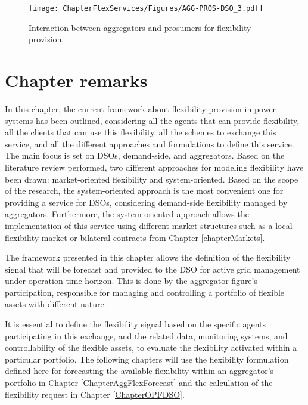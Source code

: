 \vspace*{8mm}

\begin{figure}[htbp]
	\centering
	\texttt{[image: ChapterFlexServices/Figures/AGG-PROS-DSO\_3.pdf]}
		\caption{Interaction between aggregators and prosumers for flexibility provision.}
	\label{fig:agg-pros-dso}  
\end{figure}

\newpage
\section{Chapter remarks}

In this chapter, the current framework about flexibility provision in power systems has been outlined, considering all the agents that can provide flexibility, all the clients that can use this flexibility, all the schemes to exchange this service, and all the different approaches and formulations to define this service. The main focus is set on DSOs, demand-side, and aggregators. 
Based on the literature review performed, two different approaches for modeling flexibility have been drawn: market-oriented flexibility and system-oriented. Based on the scope of the research, the system-oriented approach is the most convenient one for providing a service for DSOs, considering demand-side flexibility managed by aggregators. Furthermore, the system-oriented approach allows the implementation of this service using different market structures such as a local flexibility market or bilateral contracts from Chapter \ref{chapterMarkets}. 

The framework presented in this chapter allows the definition of the flexibility signal that will be forecast and provided to the DSO for active grid management under operation time-horizon. This is done by the aggregator figure's participation, responsible for managing and controlling a portfolio of flexible assets with different nature.

It is essential to define the flexibility signal based on the specific agents participating in this exchange, and the related data, monitoring systems, and controllability of the flexible assets, to evaluate the flexibility activated within a particular portfolio. The following chapters will use the flexibility formulation defined here for forecasting the available flexibility within an aggregator's portfolio in Chapter \ref{ChapterAggFlexForecast} and the calculation of the flexibility request in Chapter \ref{ChapterOPFDSO}. 



